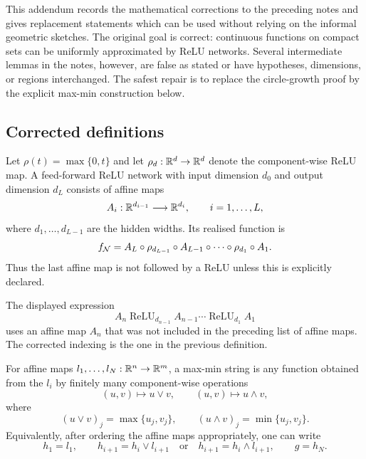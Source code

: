 
This addendum records the mathematical corrections to the preceding notes and gives replacement statements which can be used without relying on the informal geometric sketches.  The original goal is correct: continuous functions on compact sets can be uniformly approximated by ReLU networks.  Several intermediate lemmas in the notes, however, are false as stated or have hypotheses, dimensions, or regions interchanged.  The safest repair is to replace the circle-growth proof by the explicit max-min construction below.

\subsection{Corrected definitions}

\begin{defn}
Let $\rho(t)=\max\{0,t\}$ and let $\rho_d:\mathbb{R}^d\to\mathbb{R}^d$ denote the component-wise ReLU map.  A feed-forward ReLU network with input dimension $d_0$ and output dimension $d_L$ consists of affine maps
\[
A_i:\mathbb{R}^{d_{i-1}}\longrightarrow \mathbb{R}^{d_i},\qquad i=1,\ldots,L,
\]
where $d_1,\ldots,d_{L-1}$ are the hidden widths.  Its realised function is
\[
f_{\mathcal{N}}=A_L\circ \rho_{d_{L-1}}\circ A_{L-1}\circ\cdots\circ \rho_{d_1}\circ A_1.
\]
Thus the last affine map is not followed by a ReLU unless this is explicitly declared.
\end{defn}

\begin{remark}
The displayed expression
\[
A_n\operatorname{ReLU}_{d_{n-1}}A_{n-1}\cdots \operatorname{ReLU}_{d_1}A_1
\]
uses an affine map $A_n$ that was not included in the preceding list of affine maps.  The corrected indexing is the one in the previous definition.
\end{remark}

\begin{defn}
For affine maps $l_1,\ldots,l_N:\mathbb{R}^n\to\mathbb{R}^m$, a max-min string is any function obtained from the $l_i$ by finitely many component-wise operations
\[
(u,v)\longmapsto u\vee v,
\qquad
(u,v)\longmapsto u\wedge v,
\]
where
\[
(u\vee v)_j=\max\{u_j,v_j\},
\qquad
(u\wedge v)_j=\min\{u_j,v_j\}.
\]
Equivalently, after ordering the affine maps appropriately, one can write
\[
h_1=l_1,
\qquad
h_{i+1}=h_i\vee l_{i+1}\quad\text{or}\quad h_{i+1}=h_i\wedge l_{i+1},
\qquad
g=h_N.
\]
\end{defn}

